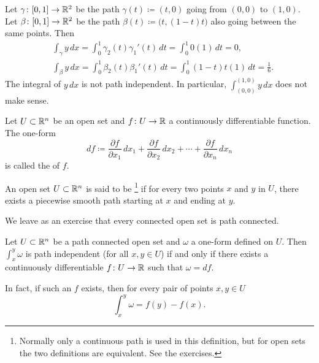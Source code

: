 \begin{example}
Let $\gamma \colon [0,1] \to {\mathbb{R}}^2$ be the path $\gamma(t) \coloneqq (t,0)$
going from $(0,0)$ to $(1,0)$.  Let $\beta \colon [0,1] \to {\mathbb{R}}^2$ be the path
$\beta(t) \coloneqq \bigl(t,(1-t)t\bigr)$ also going between the same points.  Then
\begin{align*}
& \int_\gamma y \, dx = 
\int_0^1 \gamma_2(t) \gamma_1'(t) \, dt
=
\int_0^1 0 (1) \, dt = 0 ,\\
& \int_\beta y \, dx = 
\int_0^1 \beta_2(t) \beta_1'(t) \, dt
=
\int_0^1 (1-t)t(1) \, dt = \frac{1}{6} .
\end{align*}
The integral of $y\,dx$ is not path independent.
In particular,
$\int_{(0,0)}^{(1,0)} y\,dx$ does not make sense.
\end{example}

\begin{defn}
Let $U \subset {\mathbb{R}}^n$ be an open set and $f \colon U \to {\mathbb{R}}$ a 
continuously differentiable function.  The one-form
\begin{equation*}
df \coloneqq
\frac{\partial f}{\partial x_1} \, dx_1 + 
\frac{\partial f}{\partial x_2} \, dx_2 + \cdots +
\frac{\partial f}{\partial x_n} \, dx_n 
\end{equation*}
is called the \emph{} of $f$.

An open set $U \subset {\mathbb{R}}^n$ is said to be \emph{}%
\footnote{Normally only a continuous path is used in this definition, but
for open sets the two definitions are equivalent.  See the exercises.}
if for every two points $x$ and $y$ in $U$, there exists a piecewise smooth
path starting at $x$ and ending at $y$.
\end{defn}

We leave as an exercise that every connected open set is path
connected.

\begin{prop} \label{mv:prop:pathinddf}
Let $U \subset {\mathbb{R}}^n$ be a path connected open set and $\omega$ a one-form
defined on $U$.  Then
$\int_x^y \omega$
is path independent (for all $x,y \in U$) if and only if there exists
a continuously differentiable $f \colon U \to {\mathbb{R}}$ such that $\omega = df$.

In fact, if such an $f$ exists, then for every pair of points $x,y \in U$
\begin{equation*}
\int_{x}^y \omega = f(y)-f(x) .
\end{equation*}
\end{prop}

